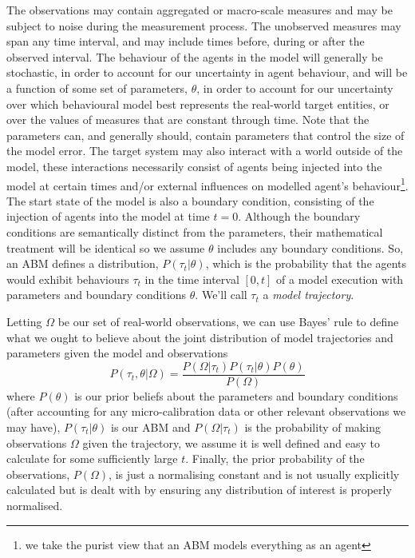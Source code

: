 \documentclass{article}
\begin{document}
The observations may contain aggregated or macro-scale measures and may be subject to noise during the measurement process. The unobserved measures may span any time interval, and may include times before, during or after the observed interval. The behaviour of the agents in the model will generally be stochastic, in order to account for our uncertainty in agent behaviour, and will be a function of some set of parameters, $\theta$, in order to account for our uncertainty over which behavioural model best represents the real-world target entities, or over the values of measures that are constant through time. Note that the parameters can, and generally should, contain parameters that control the size of the model error. The target system may also interact with a world outside of the model, these interactions necessarily consist of agents being injected into the model at certain times and/or external influences on modelled agent's behaviour\footnote{we take the purist view that an ABM models everything as an agent}. The start state of the model is also a boundary condition, consisting of the injection of agents into the model at time $t=0$. Although the boundary conditions are semantically distinct from the parameters, their mathematical treatment will be identical so we assume $\theta$ includes any boundary conditions. So, an ABM defines a distribution, $P(\tau_t| \theta)$, which is the probability that the agents would exhibit behaviours $\tau_t$ in the time interval $[0,t]$ of a model execution with parameters and boundary conditions $\theta$. We'll call $\tau_t$ a \textit{model trajectory}.

Letting $\Omega$ be our set of real-world observations, we can use Bayes' rule to define what we ought to believe about the joint distribution of model trajectories and parameters given the model and observations
\begin{equation}
P(\tau_t,\theta|\Omega) = \frac{P(\Omega|\tau_t)P(\tau_t|\theta)P(\theta)}{P(\Omega)}
\label{bayesassimilation}
\end{equation}
where $P(\theta)$ is our prior beliefs about the parameters and boundary conditions (after accounting for any micro-calibration data or other relevant observations we may have), $P(\tau_t|\theta)$ is our ABM and $P(\Omega|\tau_t)$ is the probability of making observations $\Omega$ given the trajectory, we assume it is well defined and easy to calculate for some sufficiently large $t$. Finally, the prior probability of the observations, $P(\Omega)$, is just a normalising constant and is not usually explicitly calculated but is dealt with by ensuring any distribution of interest is properly normalised.
\end{document}
